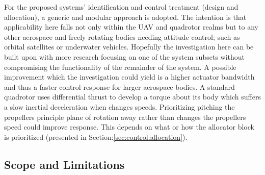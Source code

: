 \par
For the proposed systems' identification and control treatment (design and allocation), a generic and modular approach is adopted. The intention is that applicability here falls not only within the UAV and quadrotor realms but to any other aerospace and freely rotating bodies needing attitude control; such as orbital satellites or underwater vehicles. Hopefully the investigation here can be built upon with more research focusing on one of the system subsets without compromising the functionality of the remainder of the system. A possible improvement which the investigation could yield is a higher actuator bandwidth and thus a faster control response for larger aerospace bodies. A standard quadrotor uses differential thrust to develop a torque about its body which suffers a slow inertial deceleration when changes speeds. Prioritizing pitching the propellers principle plane of rotation away rather than changes the propellers speed could improve response. This depends on what or how the allocator block is prioritized (presented in Section:\ref{sec:control.allocation}).
\subsection{Scope and Limitations}
\label{subsec:intro.foreword.scopeandlim}
